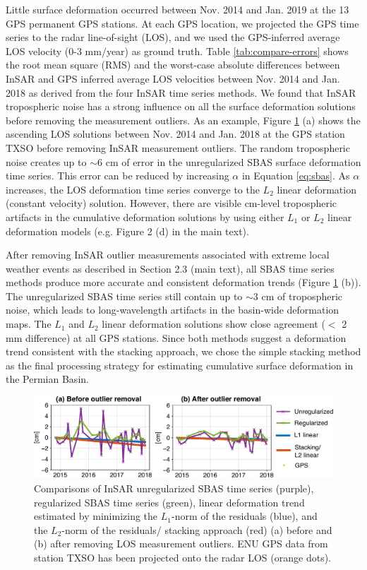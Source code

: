 \documentclass{utexasthesis}
\begin{document}
Little surface deformation occurred between Nov. 2014 and Jan. 2019 at the 13 GPS permanent GPS stations. At each GPS location, we projected the GPS time series to the radar line-of-sight (LOS), and we used the GPS-inferred average LOS velocity (0-3 mm/year) as ground truth. Table \ref{tab:compare-errors} shows the root mean square (RMS) and the worst-case absolute differences between InSAR and GPS inferred average LOS velocities between Nov. 2014 and Jan. 2018 as derived from the four InSAR time series methods. We found that InSAR tropospheric noise has a strong influence on all the surface deformation solutions before removing the measurement outliers. As an example, Figure \ref{fig:compare} (a) shows the ascending LOS solutions between Nov. 2014 and Jan. 2018 at the GPS station TXSO before removing InSAR measurement outliers. The random tropospheric noise creates up to $\sim$6 cm of error in the unregularized SBAS surface deformation time series. This error can be reduced by increasing $ \alpha$ in Equation \eqref{eq:sbas}. As $\alpha$ increases, the LOS deformation time series converge to the $L_2$ linear deformation (constant velocity) solution. However, there are visible cm-level tropospheric artifacts in the cumulative deformation solutions by using either $L_1$ or $L_2$ linear deformation models (e.g. Figure 2 (d) in the main text). 

After removing InSAR outlier measurements associated with extreme local weather events as described in Section 2.3 (main text), all SBAS time series methods produce more accurate and consistent deformation trends (Figure \ref{fig:compare} (b)). The unregularized SBAS time series still contain up to $\sim$3 cm of tropospheric noise, which leads to long-wavelength artifacts in the basin-wide deformation maps. The $ L_1 $ and $ L_2 $ linear deformation solutions show close agreement ($<$ 2 mm difference) at all GPS stations. Since both methods suggest a deformation trend consistent with the stacking approach, we chose the simple stacking method as the final processing strategy for estimating cumulative surface deformation in the Permian Basin.

\begin{figure}
	\centering
	\includegraphics[width=\textwidth]{paper1-permian/figures/supplement/figureS5-compare-insar-2panel.pdf}
	\caption[Comparisons of InSAR SBAS solutions]{Comparisons of InSAR unregularized SBAS time series (purple), regularized SBAS time series (green), linear deformation trend estimated by minimizing the $L_1$-norm of the residuals (blue), and the $L_2$-norm of the residuals/ stacking approach (red)  (a) before and (b) after removing LOS measurement outliers. ENU GPS data from station TXSO has been projected onto the radar LOS (orange dots).}
	\label{fig:compare}
\end{figure}
\end{document}
